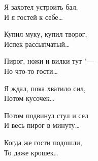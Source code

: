Я захотел устроить бал, \\
И я гостей к себе\dots{}

Купил муку, купил творог, \\
Испек рассыпчатый\dots{}

Пирог, ножи и вилки тут "--- \\
Но что-то гости\dots{}

Я ждал, пока хватило сил, \\
Потом кусочек\dots{}

Потом подвинул стул и сел \\
И весь пирог в минуту\dots{}

Когда же гости подошли, \\
То даже крошек\dots{}